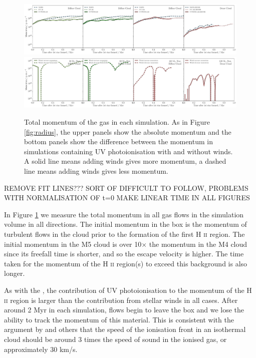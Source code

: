 \documentclass[a4paper,fleqn,usenatbib]{mnras}
\newcommand{\HII}{H \textsc{ii}\xspace}
\begin{document}
\begin{figure}
	\includegraphics[width=2\columnwidth]{../plots/momentum_both.pdf}
	\includegraphics[width=2\columnwidth]{../plots/momentum_both_compare.pdf}
	\caption{Total momentum of the gas in each simulation. As in Figure \ref{fig:radius}, the upper panels show the absolute momentum and the bottom panels show the difference between the momentum in simulations containing UV photoionisation with and without winds.  A solid line means adding winds gives more momentum, a dashed line means adding winds gives less momentum.}
	\label{fig:momentum}
\end{figure}

REMOVE FIT LINES??? SORT OF DIFFICULT TO FOLLOW, PROBLEMS WITH NORMALISATION OF t=0
MAKE LINEAR TIME IN ALL FIGURES

In Figure \ref{fig:momentum} we measure the total momentum in all gas flows in the simulation volume in all directions. The initial momentum in the box is the momentum of turbulent flows in the cloud prior to the formation of the first \HII region. The initial momentum in the M5 cloud is over 10$\times$ the momentum in the M4 cloud since its freefall time is shorter, and so the escape velocity is higher. The time taken for the momentum of the \HII region(s) to exceed this background is also longer. 

As with the \SFE, the contribution of UV photoionisation to the momentum of the \HII region is larger than the contribution from stellar winds in all cases. After around 2 Myr in each simulation, flows begin to leave the box and we lose the ability to track the momentum of this material. This is consistent with the argument by \cite{Franco1990} and others that the speed of the ionisation front in an isothermal cloud should be around 3 times the speed of sound in the ionised gas, or approximately 30 km/s. 
\end{document}
